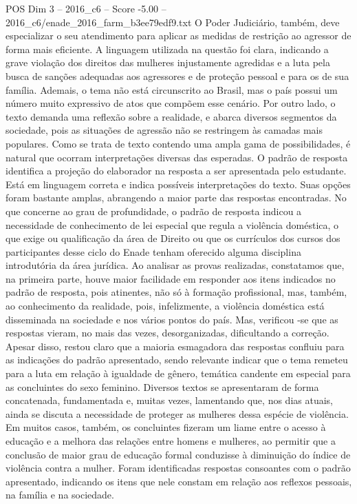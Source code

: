 \begin{textsample}{POS Dim 3 – 2016\_c6 – Score -5.00 – 2016\_c6/enade\_2016\_farm\_b3ee79edf9.txt}
O Poder Judiciário, também, deve especializar o seu atendimento para aplicar as medidas de restrição ao agressor de forma mais eficiente.
A linguagem utilizada na questão foi clara, indicando a grave violação dos direitos das mulheres injustamente agredidas e a luta pela busca de sanções adequadas aos agressores e de proteção pessoal e para os de sua família.
Ademais, o tema não está circunscrito ao Brasil, mas o país possui um número muito expressivo de atos que compõem esse cenário.
Por outro lado, o texto demanda uma reflexão sobre a realidade, e abarca diversos segmentos da sociedade, pois as situações de agressão não se restringem às camadas mais populares.
Como se trata de texto contendo uma ampla gama de possibilidades, é natural que ocorram interpretações diversas das esperadas.
O padrão de resposta identifica a projeção do elaborador na resposta a ser apresentada pelo estudante.
Está em linguagem correta e indica possíveis interpretações do texto.
Suas opções foram bastante amplas, abrangendo a maior parte das respostas encontradas.
No que concerne ao grau de profundidade, o padrão de resposta indicou a necessidade de conhecimento de lei especial que regula a violência doméstica, o que exige ou qualificação da área de Direito ou que os currículos dos cursos dos participantes desse ciclo do Enade tenham oferecido alguma disciplina introdutória da área jurídica.
Ao analisar as provas realizadas, constatamos que, na primeira parte, houve maior facilidade em responder aos itens indicados no padrão de resposta, pois atinentes, não só à formação profissional, mas, também, ao conhecimento da realidade, pois, infelizmente, a violência doméstica está disseminada na sociedade e nos vários pontos do país.
Mas, verificou -se que as respostas vieram, no mais das vezes, desorganizadas, dificultando a correção.
Apesar disso, restou claro que a maioria esmagadora das respostas confluiu para as indicações do padrão apresentado, sendo relevante indicar que o tema remeteu para a luta em relação à igualdade de gênero, temática candente em especial para as concluintes do sexo feminino.
Diversos textos se apresentaram de forma concatenada, fundamentada e, muitas vezes, lamentando que, nos dias atuais, ainda se discuta a necessidade de proteger as mulheres dessa espécie de violência.
Em muitos casos, também, os concluintes fizeram um liame entre o acesso à educação e a melhora das relações entre homens e mulheres, ao permitir que a conclusão de maior grau de educação formal conduzisse à diminuição do índice de violência contra a mulher.
Foram identificadas respostas consoantes com o padrão apresentado, indicando os itens que nele constam em relação aos reflexos pessoais, na família e na sociedade.

\end{textsample}
